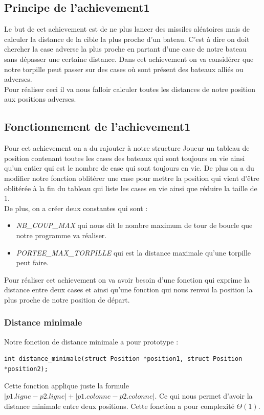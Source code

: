 \subsection{Principe de l'achievement1}
Le but de cet achievement est de ne plus lancer des missiles aléatoires mais de calculer la distance de la cible la plus proche d'un bateau. C'est à dire on doit chercher la case adverse la plus proche en partant d'une case de notre bateau sans dépasser une certaine distance. Dans cet achievement on va considérer que notre torpille peut passer sur des cases où sont présent des bateaux alliés ou adverses.\\
Pour réaliser ceci il va nous falloir calculer toutes les distances de notre position aux positions adverses.
\subsection{Fonctionnement de l'achievement1}
Pour cet achievement on a du rajouter à notre structure Joueur un tableau de position contenant toutes les cases des bateaux qui sont toujours en vie ainsi qu'un entier qui est le nombre de case qui sont toujours en vie. De plus on a du modifier notre fonction oblitérer une case pour mettre la position qui vient d'être oblitérée à la fin du tableau qui liste les cases en vie ainsi que réduire la taille de 1.\\
De plus, on a créer deux constantes qui sont :
\begin{itemize}
\item {\textit{NB\_COUP\_MAX}} qui nous dit le nombre maximum de tour de boucle que notre programme va réaliser.
\item {\textit{PORTEE\_MAX\_TORPILLE}} qui est la distance maximale qu'une torpille peut faire.
\end{itemize}
Pour réaliser cet achievement on va avoir besoin d'une fonction qui exprime la distance entre deux cases et ainsi qu'une fonction qui nous renvoi la position la plus proche de notre position de départ.
\subsubsection{Distance minimale}
Notre fonction de distance minimale a pour prototype :
\begin{lstlisting}
int distance_minimale(struct Position *position1, struct Position *position2);
\end{lstlisting}
Cette fonction applique juste la formule $|p1.ligne - p2.ligne| + |p1.colonne - p2.colonne|$. Ce qui nous permet d'avoir la distance minimale entre deux positions. Cette fonction a pour complexité $\Theta(1)$.
